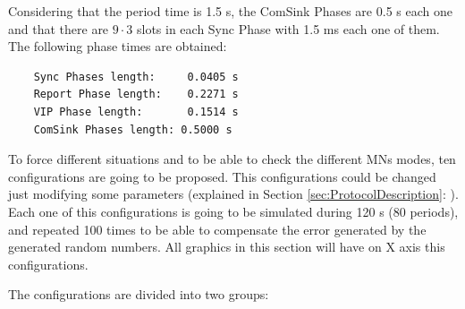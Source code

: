 Considering that the period time is 1.5 s, the ComSink Phases are 0.5 s each one and that there are $9\cdot3$ slots in each Sync Phase with 
1.5 ms each one of them. The following phase times are obtained:

\begin{verbatim}
    Sync Phases length:     0.0405 s
    Report Phase length:    0.2271 s
    VIP Phase length:       0.1514 s
    ComSink Phases length: 0.5000 s
\end{verbatim}

To force different situations and to be able to check the different \acp{MN} modes, ten configurations are going to be proposed. This 
configurations could be changed just modifying some parameters (explained in Section \ref{sec:ProtocolDescription}: ). 
Each one of this configurations is going to be simulated during 120 s (80 periods), and repeated 100 times to be able to compensate the error 
generated by the generated random numbers. All graphics in this section will have on X axis this configurations.

The configurations are divided into two groups:

